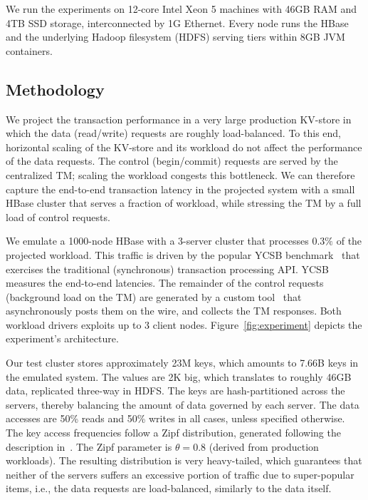 We run the experiments on 12-core Intel Xeon 5 machines with 46GB RAM and 4TB 
SSD storage, interconnected by 1G Ethernet.  Every node runs the HBase and the underlying 
Hadoop filesystem (HDFS) serving tiers within 8GB JVM containers. 

\subsection{Methodology}
We project the transaction performance in a very large production KV-store in which the data (read/write) 
requests are roughly load-balanced. To this end, horizontal scaling of the KV-store and its workload do not 
affect the performance of the data requests. The control (begin/commit) requests are served by the centralized 
TM; scaling the workload congests this bottleneck. We can therefore capture the end-to-end transaction latency
in the projected system with a small HBase cluster that serves a fraction of workload, while stressing the TM 
by a full load of control requests. 

We emulate a 1000-node HBase with a 3-server cluster that processes $0.3\%$ of the projected workload. 
This traffic is driven by the popular YCSB benchmark~\cite{Cooper:2010:BCS:1807128.1807152} 
that exercises the traditional (synchronous) transaction processing API. YCSB measures the end-to-end latencies.
The remainder of the control requests (background load on the TM) are generated by a custom tool~\cite{Omid2017} 
that asynchronously posts them on the wire, and collects the TM responses. Both workload
drivers exploits up to 3 client nodes. Figure~\ref{fig:experiment} depicts the experiment's architecture. 

Our test cluster stores approximately 23M keys, which amounts to 7.66B keys in the emulated system. 
The values are 2K big, which translates to roughly 46GB data, replicated three-way in HDFS. The keys are hash-partitioned
across the servers, thereby balancing the amount of data governed by each server. The data accesses are 50\% reads and 
50\% writes in all cases, unless specified otherwise. The key access frequencies follow a Zipf distribution, generated following 
the description in~\cite{Gray:1994:QGB:191839.191886}. The Zipf parameter is $\theta=0.8$ (derived from production workloads). 
The resulting distribution is very heavy-tailed, which guarantees that neither of the servers suffers an excessive portion of traffic 
due to super-popular items, i.e., the data requests are load-balanced, similarly to the data itself.  

